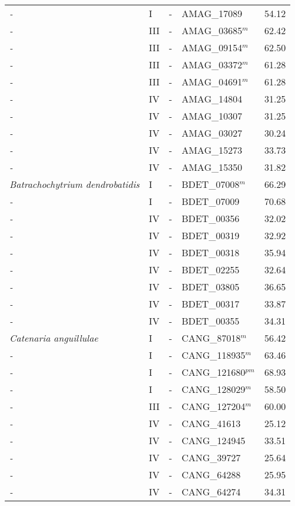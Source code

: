{{\begin{longtable}{llllr}
  \emph{-} & I & - & AMAG\_17089 & 54.12 \\ 
  \emph{-} & III & - & AMAG\_03685$^{m}$ & 62.42 \\ 
  \emph{-} & III & - & AMAG\_09154$^{m}$ & 62.50 \\ 
  \emph{-} & III & - & AMAG\_03372$^{m}$ & 61.28 \\ 
  \emph{-} & III & - & AMAG\_04691$^{m}$ & 61.28 \\ 
  \emph{-} & IV & - & AMAG\_14804 & 31.25 \\ 
  \emph{-} & IV & - & AMAG\_10307 & 31.25 \\ 
  \emph{-} & IV & - & AMAG\_03027 & 30.24 \\ 
  \emph{-} & IV & - & AMAG\_15273 & 33.73 \\ 
  \emph{-} & IV & - & AMAG\_15350 & 31.82 \\ 
  \emph{Batrachochytrium dendrobatidis } & I & - & BDET\_07008$^{m}$ & 66.29 \\ 
  \emph{-} & I & - & BDET\_07009 & 70.68 \\ 
  \emph{-} & IV & - & BDET\_00356 & 32.02 \\ 
  \emph{-} & IV & - & BDET\_00319 & 32.92 \\ 
  \emph{-} & IV & - & BDET\_00318 & 35.94 \\ 
  \emph{-} & IV & - & BDET\_02255 & 32.64 \\ 
  \emph{-} & IV & - & BDET\_03805 & 36.65 \\ 
  \emph{-} & IV & - & BDET\_00317 & 33.87 \\ 
  \emph{-} & IV & - & BDET\_00355 & 34.31 \\ 
  \emph{Catenaria anguillulae} & I & - & CANG\_87018$^{m}$ & 56.42 \\ 
  \emph{-} & I & - & CANG\_118935$^{m}$ & 63.46 \\ 
  \emph{-} & I & - & CANG\_121680$^{pm}$ & 68.93 \\ 
  \emph{-} & I & - & CANG\_128029$^{m}$ & 58.50 \\ 
  \emph{-} & III & - & CANG\_127204$^{m}$ & 60.00 \\ 
  \emph{-} & IV & - & CANG\_41613 & 25.12 \\ 
  \emph{-} & IV & - & CANG\_124945 & 33.51 \\ 
  \emph{-} & IV & - & CANG\_39727 & 25.64 \\ 
  \emph{-} & IV & - & CANG\_64288 & 25.95 \\ 
  \emph{-} & IV & - & CANG\_64274 & 34.31 \\ 

\end{longtable}}}
